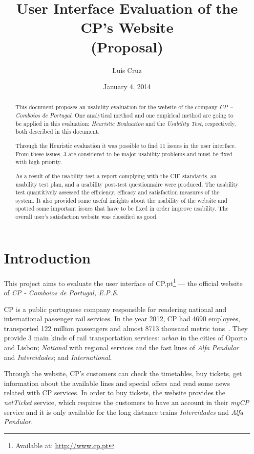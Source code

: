 \documentclass[a4paper]{article}
\title{User Interface Evaluation of the CP's Website\\ (Proposal)}
\author[1]{Luís  Cruz}
\affil[1]{MAP-i\\ Joint Doctoral Programme in Computer Science}
\date{January 4, 2014}
\begin{document}
\maketitle

\begin{abstract}
This document proposes an usability evaluation for the website of the company \emph{CP -- Comboios de Portugal}.
One analytical method and one empirical method are going to be applied in this evaluation: \emph{Heuristic Evaluation} and the \emph{Usability Test}, respectively, both described in this document.
  
Through the Heuristic evaluation it was possible to find 11 issues in the user interface. From these issues, 3 are considered to be major usability problems and must be fixed with high priority.

As a result of the usability test a report complying with the CIF standards, an usability test plan, and a usability post-test questionnaire were produced. The usability test quantitively assessed the efficiency, efficacy and satisfaction measures of the system. It also provided some useful insights about the usability of the website and spotted some important issues that have to be fixed in order improve usability. The overall user's satisfaction website was classified as good. 

\end{abstract}

\section{Introduction}

This project aims to evaluate the user interface of CP.pt\footnote{Available at: \url{http://www.cp.pt}} --- the official website of \emph{CP - Comboios de Portugal, E.P.E}.

CP is a public portuguese company responsible for rendering national and international passenger rail services. In the year 2012, CP had 4690 employees, transported 122 million passengers and almost 8713 thousand metric tons~\citep{CP2012aa}. They provide 3 main kinds of rail transportation services: \emph{urban} in the cities of Oporto and Lisbon; \emph{National} with regional services and the fast lines of \emph{Alfa Pendular} and \emph{Intercidades}; and \emph{International}.

Through the website, CP's customers can check the timetables, buy tickets, get information about the available lines and special offers and read some news related with CP services. In order to buy tickets, the website provides the \emph{netTicket} service, which requires the customers to have an account in their \emph{myCP} service and it is only available for the long distance trains \emph{Intercidades} and \emph{Alfa Pendular}.
\end{document}
